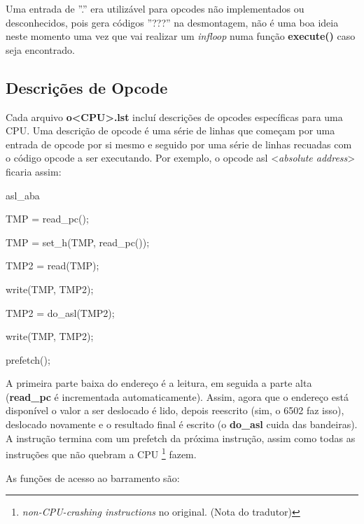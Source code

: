 \documentclass[letterpaper,10pt,brazil]{sphinxmanual}
\begin{document}
Uma entrada de ''.'' era utilizável para opcodes não implementados ou
desconhecidos, pois gera códigos ''???'' na desmontagem, não é uma boa
ideia neste momento uma vez que vai realizar um \emph{infloop} numa função
\textbf{execute()} caso seja encontrado.


\subsection{Descrições de Opcode}
\label{techspecs/m6502:descricoes-de-opcode}
Cada arquivo \textbf{o\textless{}CPU\textgreater{}.lst} incluí descrições de opcodes específicas
para uma CPU. Uma descrição de opcode é uma série de linhas que começam
por uma entrada de opcode por si mesmo e seguido por uma série de linhas
recuadas com o código opcode a ser executando.
Por exemplo, o opcode asl \textless{}\emph{absolute address}\textgreater{} ficaria assim:

\begin{DUlineblock}{0em}
\item[] asl\_aba
\item[]
\begin{DUlineblock}{\DUlineblockindent}
\item[] TMP = read\_pc();
\item[] TMP = set\_h(TMP, read\_pc());
\item[] TMP2 = read(TMP);
\item[] write(TMP, TMP2);
\item[] TMP2 = do\_asl(TMP2);
\item[] write(TMP, TMP2);
\item[] prefetch();
\end{DUlineblock}
\end{DUlineblock}

A primeira parte baixa do endereço é a leitura, em seguida a parte alta
(\textbf{read\_pc} é incrementada automaticamente). Assim, agora que o
endereço está disponível o valor a ser deslocado é lido, depois
reescrito (sim, o 6502 faz isso), deslocado novamente e o resultado
final é escrito (o \textbf{do\_asl} cuida das bandeiras). A instrução termina
com um prefetch da próxima instrução, assim como todas as instruções que
não quebram a CPU \footnote[1]{\sphinxAtStartFootnote%
\emph{non-CPU-crashing instructions} no original. (Nota do tradutor)
} fazem.

As funções de acesso ao barramento são:
\end{document}
